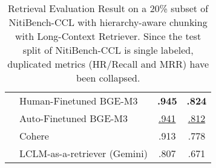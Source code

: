 \begin{table}[!ht]
\begin{tabular}{@{}clcc@{}}
  & Human-Finetuned BGE-M3 & \textbf{.945}  & \textbf{.824} \\
  & Auto-Finetuned BGE-M3  & \underline{.941} & \underline{.812} \\
  & Cohere                 & .913           & .778 \\
  & LCLM-as-a-retriever (Gemini)                   & .807           & .671 \\ \bottomrule
\end{tabular}
\caption{Retrieval Evaluation Result on a 20\% subset of NitiBench-CCL with hierarchy-aware chunking with Long-Context Retriever. Since the test split of NitiBench-CCL is single labeled, duplicated metrics (HR/Recall and MRR) have been collapsed.}
\label{table: retrieval_wcx_lclm}
\end{table}



